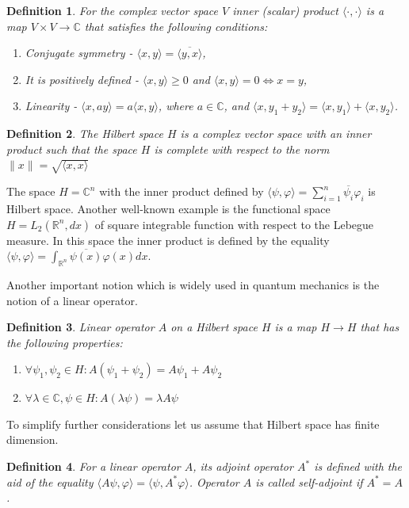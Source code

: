 \documentclass[%
master,         %
subf,           %
href,           %
colorlinks=true %
]{disser}
\numberwithin{equation}{section}
\numberwithin{figure}{section}
\newtheorem{definition}{Definition}[section]
\begin{document}
\begin{definition}
For the complex vector space $V$ inner (scalar) product $\langle\cdot,\cdot\rangle$ is a map $V\times V \to \mathbb{C}$ that satisfies the following conditions:
\begin{enumerate}
\item Conjugate symmetry - $\langle x, y\rangle = \overline{\langle y, x\rangle}$,
\item It is positively defined - $\langle x, y\rangle \geq 0$ and $\langle x, y\rangle = 0 \Leftrightarrow x = y$,
\item Linearity - $\langle x, ay\rangle = a\langle x, y\rangle$, where $a\in\mathbb{C}$, and $\langle x, y_1 + y_2\rangle = \langle x, y_1\rangle + \langle x, y_2\rangle$.
\end{enumerate}
\end{definition}

\begin{definition}
The Hilbert space $H$ is a complex vector space with an inner product such that the space $H$ is complete with respect to the norm $\|x\| = \sqrt{\langle x, x\rangle}$
\end{definition}

The space $H = \mathbb{C}^n$ with the inner product defined by $\langle\psi, \varphi \rangle = \sum_{i = 1}^n \overline{\psi_i}\varphi_i$ is Hilbert space. Another well-known example is the functional space $H = L_2(\mathbb{R}^n, dx)$ of square integrable function with respect to the Lebegue measure. In this space the inner product is defined by the equality $\langle\psi, \varphi \rangle = \int_{\mathbb{R}^n}\overline{\psi(x)}\varphi(x) dx$.

Another important notion which is widely used in quantum mechanics is the notion of a linear operator.
\begin{definition}
Linear operator $A$ on a Hilbert space $H$ is a map $H \to H$ that has the following properties:
\begin{enumerate}
\item $\forall \psi_1,\psi_2\in H: A(\psi_1 + \psi_2) = A\psi_1 + A\psi_2 $
\item $\forall\lambda\in\mathbb{C}, \psi\in H: A(\lambda\psi) = \lambda A\psi$
\end{enumerate}
\end{definition}

To simplify further considerations let us assume that Hilbert space has finite dimension.

\begin{definition}
For a linear operator $A$, its adjoint operator $A^*$ is defined with the aid of the equality $\langle A\psi,\varphi\rangle = \langle\psi, A^*\varphi\rangle$. Operator $A$ is called self-adjoint if $A^* = A$.
\end{definition}
\end{document}
